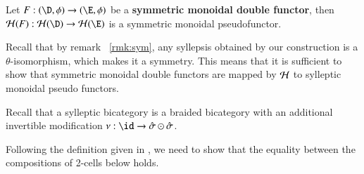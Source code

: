 \begin{lem}\label{lem:symfun}
Let $F:(\D, \phi) \rightarrow (\E, \phi)$ be a {\bf symmetric monoidal double functor}, then $\cH(F): \cH(\D) \rightarrow \cH(\E)$ is a symmetric monoidal pseudofunctor. 
\end{lem}

Recall that by remark ~\ref{rmk:sym}, any syllepsis obtained by our construction is a $\theta$-isomorphism, which makes it a symmetry. This means that it is sufficient to show that symmetric monoidal double functors are mapped by $\mathcal{H}$ to sylleptic monoidal pseudo functors. 

Recall that a sylleptic bicategory is a braided bicategory with an additional invertible modification $\nu: \id \rightarrow \hat{\sigma} \odot \hat{\sigma}$. 

Following the definition given in \cite{mccrudden:bal-coalgb}, 
we need to show that the equality between the compositions of 2-cells below holds. 

